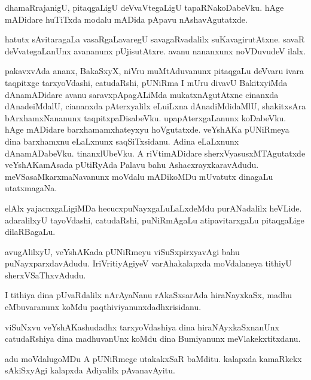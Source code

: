 \documentclass{article}
\begin{document}
\begin{mn}%
dhamaRrajanigU, pitaqgaLigU deVvaVtegaLigU tapaRNakoDabeVku. hAge mADidare huTiTxda modalu 
mADida pApavu nAshavAgutatxde.
\end{mn}

\begin{mn}%
hatutx sAvitaragaLa vasaRgaLavaregU savagaRvadalilx suKavagirutAtxne. savaR 
deVvategaLanUnx avananunx pUjisutAtxre. avanu nananxunx noVDuvudeV ilalx.
\end{mn}

\begin{mn}%
pakavxvAda ananx, BakaSxyX, niVru muMtAduvanunx pitaqgaLu deVvaru ivara taqpitxge 
tarxyoVdashi, catudaRshi, pUNiRma I mUru divavU BakitxyiMda dAnamADidare avanu 
saravxpApagALiMda mukatxnAgutAtxne cinanxda dAnadeiMdalU, ciananxda pAterxyalilx eLuiLxna 
dAnadiMdidaMlU, shakitxsAra bArxhamxNananunx taqpitxpaDisabeVku. upapAterxgaLanunx 
koDabeVku. hAge mADidare barxhamamxhateyxyu hoVgutatxde. veYshAKa pUNiRmeya dina 
barxhamxnu eLaLxnunx saqSiTxsidanu. Adina eLaLxnunx dAnamADabeVku. tinanxlUbeVku. A 
riVtimADidare sherxVyasusxMTAgutatxde veYshAKamAsada pUtiRyAda Palavu bahu 
AshacxrayxkaravAdudu. meVSasaMkarxmaNavanunx moVdalu mADikoMDu mUvatutx dinagaLu 
utatxmagaNa.
\end{mn}

\begin{mn}%
elAlx yajacnxgaLigiMDa hecucxpuNayxgaLuLaLxdeMdu purANadalilx heVLide. adaralilxyU 
tayoVdashi, catudaRshi, puNiRmAgaLu atipavitarxgaLu pitaqgaLige dilaRBagaLu.
\end{mn}

\begin{mn}%
avugAlilxyU, veYshAKada pUNiRmeyu viSuSxpirxyavAgi bahu puNayxparxdavAdudu. 
IriVritiyAgiyeV varAhakalapxda moVdalaneya tithiyU sherxVSaThxvAdudu.
\end{mn}

\begin{mn}%
I tithiya dina pUvaRdalilx nArAyaNanu rAkaSxsarAda hiraNayxkaSx, madhu eMbuvaranunx koMdu 
paqthiviyanunxdadhxrisidanu.
\end{mn}

\begin{mn}%
viSuNxvu veYshAKashudadhx tarxyoVdashiya dina hiraNAyxkaSxnanUnx catudaRshiya dina 
madhuvanUnx koMdu dina Bumiyanunx meVlakekxtitxdanu.
\end{mn}

\begin{mn}%
adu moVdalugoMDu A pUNiRmege utakakxSaR baMditu. kalapxda kamaRkekx sAkiSxyAgi kalapxda 
Adiyalilx pAvanavAyitu.
\end{mn}
\end{document}
